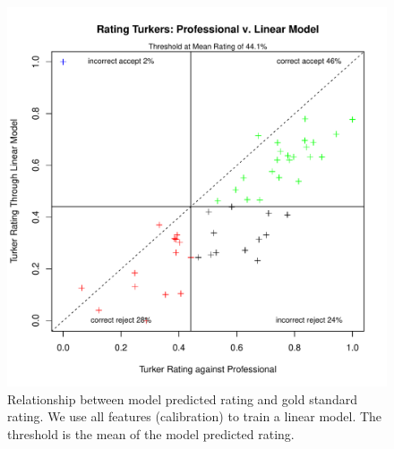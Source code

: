 \documentclass[11pt]{article}
\begin{document}
\begin{figure}[htbp]
  \centering
  \includegraphics[width=\linewidth]{AllFeatureWithCali/rrankingallfeaturewithcalilm.pdf}
  \caption{Relationship between model predicted rating and gold standard rating. We use all features (calibration) to train a linear model. The threshold is the mean of the model predicted rating.}
    \label{flmallcalirrating1}
\end{figure}
\end{document}
